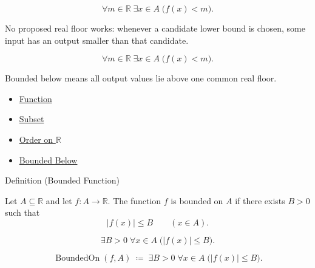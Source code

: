 \begin{remark*}
\[
  \forall m\in\mathbb{R}\;\exists x\in A\;\bigl(f(x)<m\bigr).
\]
\end{remark*}

\begin{remark*}
No proposed real floor works: whenever a candidate lower bound is chosen,
some input has an output smaller than that candidate.
\end{remark*}

\begin{remark*}
\[
  \forall m\in\mathbb{R}\;\exists x\in A\;\bigl(f(x)<m\bigr).
\]
\end{remark*}

\begin{remark*}[Interpretation]
Bounded below means all output values lie above one common real floor.
\end{remark*}

\begin{dependencies}
\begin{itemize}
  \item \hyperref[def:function]{Function}
  \item \hyperref[def:subset]{Subset}
  \item \hyperref[def:order-on-r]{Order on $\mathbb{R}$}
  \item \hyperref[def:bounded-below]{Bounded Below}
\end{itemize}
\end{dependencies}

\begin{definitionbox}{Definition (Bounded Function)}
\begin{definition}
\label{def:function-bounded}
Let $A\subseteq\mathbb{R}$ and let $f:A\to\mathbb{R}$.  The function
$f$ is bounded on $A$ if there exists $B>0$ such that
\[
  |f(x)|\leq B
  \qquad (x\in A).
\]
\end{definition}
\end{definitionbox}

\begin{remark*}
\[
  \exists B>0\;\forall x\in A\;\bigl(|f(x)|\leq B\bigr).
\]
\end{remark*}

\begin{remark*}
\[
  \operatorname{BoundedOn}(f,A)
  \;\coloneqq\;
  \exists B>0\;\forall x\in A\;\bigl(|f(x)|\leq B\bigr).
\]
\end{remark*}

